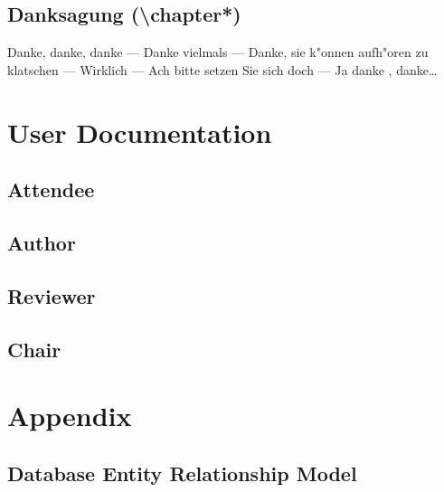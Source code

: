 \documentclass[nochapterpage,nopartpage,numbersubsubsec,bigchapter,colorback,accentcolor=tud9c]{tudreport}
\begin{document}
  \chapter*{Danksagung (\textbackslash chapter*)}    \noindent
      Danke, danke, danke --- Danke vielmals --- Danke, sie k"onnen aufh"oren zu klatschen ---
      Wirklich --- Ach bitte setzen Sie sich doch --- Ja danke , danke\dots



\part{User Documentation \label{part:user-doc}}

  \chapter{Attendee}
  \chapter{Author}
  \chapter{Reviewer}
  \chapter{Chair}

\part{Appendix \label{part:appendix}}

  \chapter*{Database Entity Relationship Model}

\end{document}
